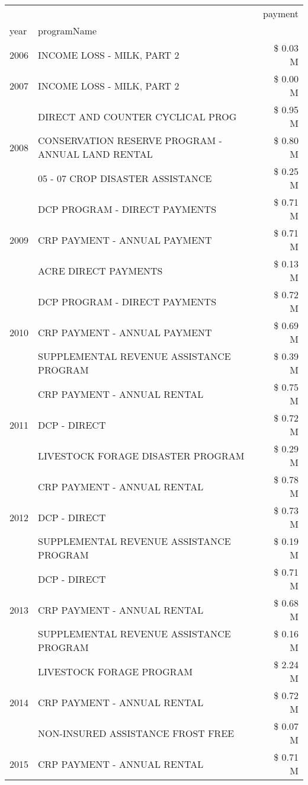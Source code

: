 \begin{tabular}{llr}
\toprule
 &  & payment \\
year & programName &  \\
\midrule
2006 & INCOME LOSS - MILK, PART 2 & \$ 0.03 M \\
\cline{1-3}
2007 & INCOME LOSS - MILK, PART 2 & \$ 0.00 M \\
\cline{1-3}
\multirow[t]{3}{*}{2008} & DIRECT AND COUNTER CYCLICAL PROG & \$ 0.95 M \\
 & CONSERVATION RESERVE PROGRAM - ANNUAL LAND RENTAL & \$ 0.80 M \\
 & 05 - 07 CROP DISASTER ASSISTANCE & \$ 0.25 M \\
\cline{1-3}
\multirow[t]{3}{*}{2009} & DCP PROGRAM - DIRECT PAYMENTS & \$ 0.71 M \\
 & CRP PAYMENT - ANNUAL PAYMENT & \$ 0.71 M \\
 & ACRE DIRECT PAYMENTS & \$ 0.13 M \\
\cline{1-3}
\multirow[t]{3}{*}{2010} & DCP PROGRAM - DIRECT PAYMENTS & \$ 0.72 M \\
 & CRP PAYMENT - ANNUAL PAYMENT & \$ 0.69 M \\
 & SUPPLEMENTAL REVENUE ASSISTANCE PROGRAM & \$ 0.39 M \\
\cline{1-3}
\multirow[t]{3}{*}{2011} & CRP PAYMENT - ANNUAL RENTAL & \$ 0.75 M \\
 & DCP - DIRECT & \$ 0.72 M \\
 & LIVESTOCK FORAGE DISASTER PROGRAM & \$ 0.29 M \\
\cline{1-3}
\multirow[t]{3}{*}{2012} & CRP PAYMENT - ANNUAL RENTAL & \$ 0.78 M \\
 & DCP - DIRECT & \$ 0.73 M \\
 & SUPPLEMENTAL REVENUE ASSISTANCE PROGRAM & \$ 0.19 M \\
\cline{1-3}
\multirow[t]{3}{*}{2013} & DCP - DIRECT & \$ 0.71 M \\
 & CRP PAYMENT - ANNUAL RENTAL & \$ 0.68 M \\
 & SUPPLEMENTAL REVENUE ASSISTANCE PROGRAM & \$ 0.16 M \\
\cline{1-3}
\multirow[t]{3}{*}{2014} & LIVESTOCK FORAGE PROGRAM & \$ 2.24 M \\
 & CRP PAYMENT - ANNUAL RENTAL & \$ 0.72 M \\
 & NON-INSURED ASSISTANCE FROST FREE & \$ 0.07 M \\
\cline{1-3}
\multirow[t]{3}{*}{2015} & CRP PAYMENT - ANNUAL RENTAL & \$ 0.71 M \\

\end{tabular}
